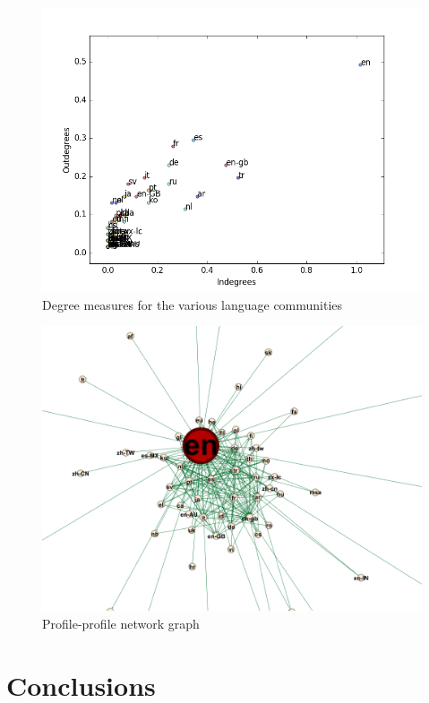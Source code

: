 \documentclass[conference]{IEEEtran}
\begin{document}
\begin{figure}[!htb]
\centering
\includegraphics[width=\columnwidth]{images/indegreeoutdegree.png}
\caption{Degree measures for the various language communities}
\label{fig:inoutdegree}
\end{figure}

\begin{figure}[!h]
\centering
\includegraphics[width=\textwidth]{images/profileprofilegraph.png}
\caption{Profile-profile network graph}
\label{fig:profileprofilegraph}
\end{figure}


\section{Conclusions}\label{conclusions}
\end{document}
